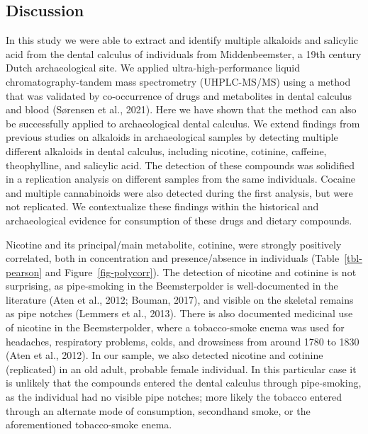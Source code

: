 \documentclass[
]{article}
\begin{document}
\hypertarget{discussion}{%
\subsection{Discussion}\label{discussion}}

In this study we were able to extract and identify multiple alkaloids
and salicylic acid from the dental calculus of individuals from
Middenbeemster, a 19th century Dutch archaeological site. We applied
ultra-high-performance liquid chromatography-tandem mass spectrometry
(UHPLC-MS/MS) using a method that was validated by co-occurrence of
drugs and metabolites in dental calculus and blood (Sørensen et al.,
2021). Here we have shown that the method can also be successfully
applied to archaeological dental calculus. We extend findings from
previous studies on alkaloids in archaeological samples by detecting
multiple different alkaloids in dental calculus, including nicotine,
cotinine, caffeine, theophylline, and salicylic acid. The detection of
these compounds was solidified in a replication analysis on different
samples from the same individuals. Cocaine and multiple cannabinoids
were also detected during the first analysis, but were not replicated.
We contextualize these findings within the historical and archaeological
evidence for consumption of these drugs and dietary compounds.

Nicotine and its principal/main metabolite, cotinine, were strongly
positively correlated, both in concentration and presence/absence in
individuals (Table~\ref{tbl-pearson} and Figure~\ref{fig-polycorr}). The
detection of nicotine and cotinine is not surprising, as pipe-smoking in
the Beemsterpolder is well-documented in the literature (Aten et al.,
2012; Bouman, 2017), and visible on the skeletal remains as pipe notches
(Lemmers et al., 2013). There is also documented medicinal use of
nicotine in the Beemsterpolder, where a tobacco-smoke enema was used for
headaches, respiratory problems, colds, and drowsiness from around 1780
to 1830 (Aten et al., 2012). In our sample, we also detected nicotine
and cotinine (replicated) in an old adult, probable female individual.
In this particular case it is unlikely that the compounds entered the
dental calculus through pipe-smoking, as the individual had no visible
pipe notches; more likely the tobacco entered through an alternate mode
of consumption, secondhand smoke, or the aforementioned tobacco-smoke
enema.
\end{document}
